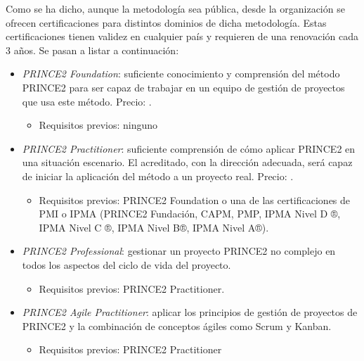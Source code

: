Como se ha dicho, aunque la metodología sea pública, desde la organización se ofrecen certificaciones para distintos dominios de dicha metodología. Estas certificaciones tienen validez en cualquier país y requieren de una renovación cada 3 años. Se pasan a listar a continuación:
\begin{itemize}
	\item \emph{PRINCE2 Foundation}: suficiente conocimiento y comprensión del método PRINCE2 para ser capaz de trabajar en un equipo de gestión de proyectos que usa este método. Precio: .
	\begin{itemize}
		\item Requisitos previos: ninguno
	\end{itemize}
	\item \emph{PRINCE2 Practitioner}: suficiente comprensión de cómo aplicar PRINCE2 en una situación escenario. El acreditado, con la dirección adecuada, será capaz de iniciar la aplicación del método a un proyecto real. Precio: .
	\begin{itemize}
		\item Requisitos previos: PRINCE2 Foundation o una de las certificaciones de PMI o IPMA (PRINCE2 Fundación, CAPM, PMP, IPMA Nivel D ®, IPMA Nivel C ®, IPMA Nivel B®, IPMA Nivel A®).
	\end{itemize}
	\item \emph{PRINCE2 Professional}: gestionar un proyecto PRINCE2 no complejo en todos los aspectos del ciclo de vida del proyecto.
	\begin{itemize}
		\item Requisitos previos: PRINCE2 Practitioner.
	\end{itemize}
	\item \emph{PRINCE2 Agile Practitioner}: aplicar los principios de gestión de proyectos de PRINCE2 y la combinación de conceptos ágiles como Scrum y Kanban.
	\begin{itemize}
		\item Requisitos previos: PRINCE2 Practitioner
	\end{itemize}
\end{itemize}